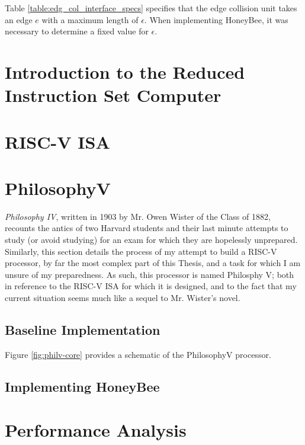 
Table \ref{table:edg_col_interface_specs} specifies that the edge collision unit takes an edge $e$ with a maximum length of $\epsilon$. When implementing HoneyBee, it was necessary to determine a fixed value for $\epsilon$. 

\section{Introduction to the Reduced Instruction Set Computer}
    

\section{RISC-V ISA}
    

\section{PhilosophyV}
    \textit{Philosophy IV}, written in 1903 by Mr. Owen Wister of the Class of 1882, recounts the antics of two Harvard students and their last minute attempts to study (or avoid studying) for an exam for which they are hopelessly unprepared. Similarly, this section details the process of my attempt to build a RISC-V processor, by far the most complex part of this Thesis, and a task for which I am unsure of my preparedness. As such, this processor is named Philosphy V; both in reference to the RISC-V ISA for which it is designed, and to the fact that my current situation seems much like a sequel to Mr. Wister's novel.

    \subsection{Baseline Implementation}
        Figure \ref{fig:philv-core} provides a schematic of the PhilosophyV processor.
         

    \subsection{Implementing HoneyBee}

\section{Performance Analysis}
